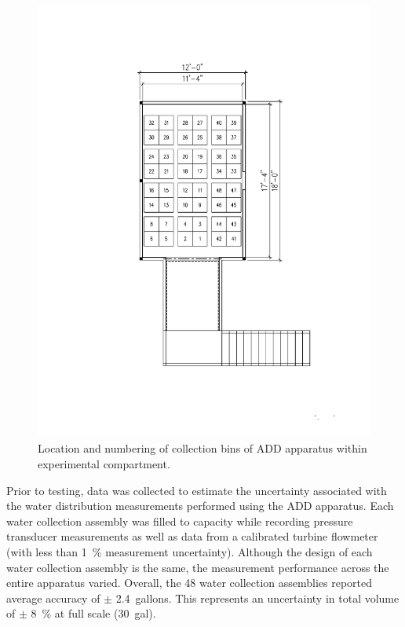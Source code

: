 \documentclass[12pt,oneside]{book}
\begin{document}
\begin{figure}[!ht]
	\centering
	\includegraphics[width=\columnwidth]{Figures/Water_Distribution/ADD_Bins}
	\caption[ADD Bin Numbers and Locations]{Location and numbering of collection bins of ADD apparatus within experimental compartment.}
	\label{fig:Bin Numbers and Locations}
\end{figure}

Prior to testing, data was collected to estimate the uncertainty associated with the water distribution measurements performed using the ADD apparatus. Each water collection assembly was filled to capacity while recording pressure transducer measurements as well as data from a calibrated turbine flowmeter (with less than 1~\% measurement uncertainty). Although the design of each water collection assembly is the same, the measurement performance across the entire apparatus varied. Overall, the 48 water collection assemblies reported average accuracy of $\pm$ 2.4~gallons. This represents an uncertainty in total volume of $\pm$ 8~\% at full scale (30~gal).
\end{document}
